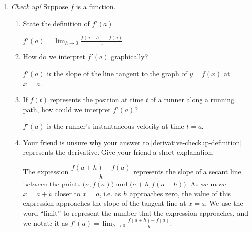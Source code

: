 \documentclass{article}
\begin{document}
\begin{enumerate}
\item  \emph{Check up!} Suppose $f$ is a function. 

  \begin{enumerate}
  \item \label{derivative-checkup-definition}
    \begin{problem}[\vfill]
      State the definition of $f'(a)$. 
    \end{problem}

    \begin{solution}
      $\displaystyle f'(a) = \lim_{h \to 0} \frac{f(a+h) - f(a)}{h}$
    \end{solution}

  \item
    \begin{problem}[\vfill]
      How do we interpret $f'(a)$ graphically?
    \end{problem}

    \begin{solution}
      $f'(a)$ is the slope of the line tangent to the graph of $y=f(x)$ at $x=a$. 
    \end{solution}

  \item
    \begin{problem}[\vfill]
      If $f(t)$ represents the position at time $t$ of a runner along a
      running path, how could we interpret $f'(a)$? 
    \end{problem}
    
    \begin{solution}
      $f'(a)$ is the runner's instantaneous velocity at time $t=a$. 
    \end{solution}

  \item


    \begin{problem}[\vfill\newpage]
      Your friend is unsure why your answer to
      \ref{derivative-checkup-definition} represents the derivative.  Give
      your friend a short explanation. 
    \end{problem}

    \begin{solution}
      The expression $\dfrac{f(a+h)-f(a)}{h}$ represents the slope of a secant line between the points $\bigl(a, f(a)\bigr)$
      and $\bigl(a+h, f(a+h)\bigr)$. As we move $x=a+h$ closer to $x=a$, i.e. as $h$ approaches zero, the value of
      this expression approaches the slope
      of the tangent line at $x=a$. We use the word ``limit'' to represent the number that the expression approaches, 
      and we notate it
      as $\displaystyle f'(a) = \lim_{h \to 0} \frac{f(a+h) - f(a)}{h}$.
    \end{solution}
  \end{enumerate}


\end{enumerate}
\end{document}
